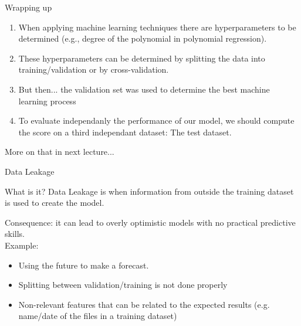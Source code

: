 \documentclass[handout]{beamer}
\begin{document}
\begin{frame}{Wrapping up}
\begin{enumerate}[<+->]
    \item When applying machine learning techniques there are \alert{hyperparameters} to be determined (e.g., degree of the polynomial in polynomial regression).
    \item These \alert{hyperparameters}  can be determined by splitting the data into training/validation or by cross-validation.
    \item But then... the validation set was used to determine the best machine learning process
    \item To evaluate independanly the performance of our model, we should compute the score on a \alert{third independant dataset: The test dataset}.
    
\end{enumerate}
\pause
More on that in next lecture...

\end{frame}


\begin{frame}{Data Leakage}

\begin{alertblock}{What is it?}
\alert{Data Leakage} is when information from outside the training dataset is used to create the model.
\end{alertblock}
\pause
Consequence: it can lead to overly optimistic models with no practical predictive skills.\\
\vspace{1em}
\pause
Example:
\begin{itemize}
    \item Using the future to make a forecast.
    \item Splitting between validation/training is not done properly
    \item Non-relevant features that can be related to the expected results (e.g. name/date of the files in a training dataset)
\end{itemize}
\end{frame}
\end{document}
